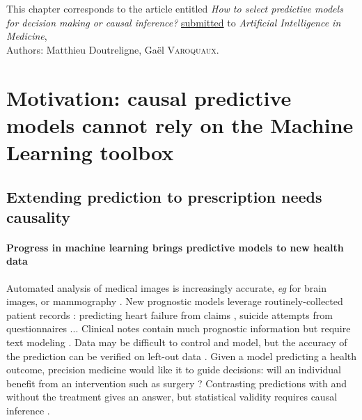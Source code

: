 \documentclass[french,12pt,twoside,a4paper]{book}
\begin{document}
\begin{flushright}
  \begin{minipage}{15cm}
    {\small{This chapter corresponds to the article entitled \textit{How to select
          predictive models for decision making or causal inference?}
        \underline{submitted} to \textit{Artificial
          Intelligence in Medicine},}}\\

    {\small\hfill{}Authors: Matthieu Doutreligne, Gaël \textsc{Varoquaux}.}
  \end{minipage}
\end{flushright}

\clearpage
\minitoc

\section{Motivation: causal predictive models cannot rely on the Machine Learning
  toolbox}\label{sec:causal_model_selection:motivation}

\subsection{Extending prediction to prescription needs causality}\label{subsec:causal_model_selection:extending_prediction}

\paragraph{Progress in machine learning brings predictive models to new health
  data} \citep{beam2018big,rajkomar2019machine} Automated analysis of medical
images is increasingly accurate, \emph{eg} for brain images,
\citep{khojaste2022deep,zhang2019radiological} or mammography
\citep{yala2019deep,shen2019deep,nassif2022breast}. New prognostic models
leverage routinely-collected patient records \citep{mooney2018bigdata}:
predicting heart failure from claims \citep{desai2020comparison}, suicide
attempts from questionnaires \citep{simon2018predicting}... Clinical notes
contain much prognostic information but require text modeling
\citep{horng2017creating,wang2020prediction,spasic2020clinical,
  jiang2023health}. Data may be difficult to control and model, but the accuracy
of the prediction can be verified on left-out data
\citep{altman2009prognosis,poldrack2020establishment,varoquaux2022evaluating}.
Given a model predicting a health outcome, precision medicine would like it to
guide decisions: will an individual benefit from an intervention such as
surgery \citep{fontana2019can}? Contrasting predictions with and without the
treatment gives an answer, but statistical validity requires causal inference
\citep{snowden2011implementation,blakely2020reflection}.
\end{document}
